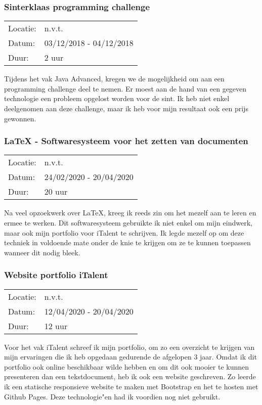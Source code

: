 \subsubsection{Sinterklaas programming challenge}

\begin{tabular}{l l}
  Locatie: & n.v.t.\\
  Datum: & 03/12/2018 - 04/12/2018\\
  Duur: & 2 uur
\end{tabular}

Tijdens het vak Java Advanced, kregen we de mogelijkheid om aan een programming challenge deel te nemen. Er moest aan de hand van een gegeven technologie een probleem opgelost worden voor de sint. Ik heb niet enkel deelgenomen aan deze challenge, maar ik heb voor mijn resultaat ook een prijs gewonnen.

\subsubsection{\LaTeX{} - Softwaresysteem voor het zetten van documenten}

\begin{tabular}{l l}
  Locatie: & n.v.t.\\
  Datum: & 24/02/2020 - 20/04/2020\\
  Duur: & 20 uur
\end{tabular}

Na veel opzoekwerk over \LaTeX{}, kreeg ik reeds zin om het mezelf aan te leren en ermee te werken. Dit softwaresysteem gebruikte ik niet enkel om mijn eindwerk, maar ook mijn portfolio voor iTalent te schrijven. Ik legde mezelf op om deze techniek in voldoende mate onder de knie te krijgen om ze te kunnen toepassen wanneer dit nodig bleek.

\subsubsection{Website portfolio iTalent}

\begin{tabular}{l l}
  Locatie: & n.v.t.\\
  Datum: & 12/04/2020 - 20/04/2020\\
  Duur: & 12 uur
\end{tabular}

Voor het vak iTalent schreef ik mijn portfolio, om zo een overzicht te krijgen van mijn ervaringen die ik heb opgedaan gedurende de afgelopen 3 jaar. Omdat ik dit portfolio ook online beschikbaar wilde hebben en om dit ook mooier te kunnen presenteren dan een tekstdocument, heb ik ook een website geschreven. Zo leerde ik een statische responsieve website te maken met Bootstrap en het te hosten met Github Pages. Deze technologie"en had ik voordien nog niet gebruikt.